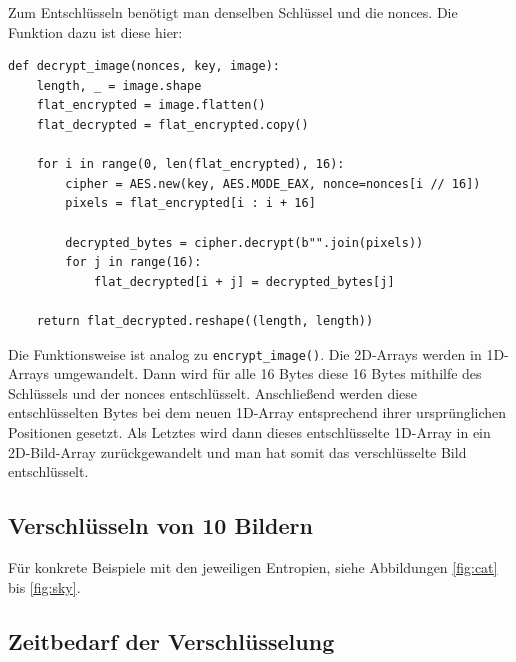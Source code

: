 Zum Entschlüsseln benötigt man denselben Schlüssel und die nonces. Die Funktion dazu ist diese hier:
\begin{lstlisting}
def decrypt_image(nonces, key, image):
    length, _ = image.shape
    flat_encrypted = image.flatten()
    flat_decrypted = flat_encrypted.copy()

    for i in range(0, len(flat_encrypted), 16):
        cipher = AES.new(key, AES.MODE_EAX, nonce=nonces[i // 16])
        pixels = flat_encrypted[i : i + 16]

        decrypted_bytes = cipher.decrypt(b"".join(pixels))
        for j in range(16):
            flat_decrypted[i + j] = decrypted_bytes[j]

    return flat_decrypted.reshape((length, length))
\end{lstlisting}
Die Funktionsweise ist analog zu \lstinline{encrypt_image()}. Die 2D-Arrays werden in 1D-Arrays umgewandelt. Dann wird für alle
16 Bytes diese 16 Bytes mithilfe des Schlüssels und der nonces entschlüsselt. Anschließend werden diese entschlüsselten Bytes
bei dem neuen 1D-Array entsprechend ihrer ursprünglichen Positionen gesetzt. Als Letztes wird dann dieses entschlüsselte 1D-Array
in ein 2D-Bild-Array zurückgewandelt und man hat somit das verschlüsselte Bild entschlüsselt.

\subsection{Verschlüsseln von 10 Bildern}
Für konkrete Beispiele mit den jeweiligen Entropien, siehe Abbildungen \ref{fig:cat} bis \ref{fig:sky}.

\subsection{Zeitbedarf der Verschlüsselung}

